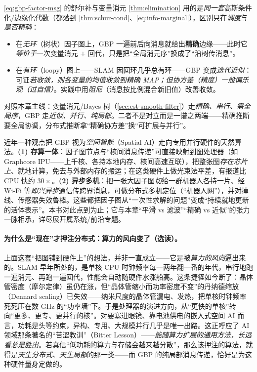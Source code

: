 \begin{insight}
\cref{eq:gbp-factor-msg} 的舒尔补与变量消元 \cref{thm:elimination} 用的是\emph{同一套}高斯条件化/边缘化代数（都落到 \cref{thm:schur-cond}、\cref{eq:info-marginal}），区别只在\emph{调度}与\emph{是否精确}：
\begin{itemize}
  \item 在\emph{无环}（树状）因子图上，GBP 一遍前后向消息就给出\textbf{精确}边缘——此时它\emph{等价于}一次变量消元 $+$ 回代，只是把“全局消元序”换成了“沿树传消息”。
  \item 在\emph{有环}（loopy）图上——SLAM 因回环几乎总有环——GBP 变成\emph{迭代近似}：可证\emph{若收敛，则各变量的均值收敛到精确 MAP；但协方差（精度）一般偏乐观（过自信）}\cite{weiss2001correctness}。实践中用\emph{阻尼}（消息按比例混合新旧值）改善收敛。
\end{itemize}
对照本章主线：变量消元/Bayes 树（\cref{sec:est-smooth-filter}）走\emph{精确、串行、需全局序}，GBP 走\emph{近似、并行、纯局部}。二者不是对立而是一谱之两端——精确推断要全局协调，分布式推断拿“精确协方差”换“可扩展与并行”。
\end{insight}

\begin{insight}
近年一种观点把 GBP 视为\emph{空间智能}（Spatial AI）走向专用并行硬件的天然算法\cite{davison2019futuremapping2}。\textbf{(1) 存算一体}：因子图节点与“核间消息传递”可直接映射到图处理器（如 Graphcore IPU——上千核、各持本地内存、核间高速互联），把整张图\emph{存在芯片上}、就地计算，免去与外部内存的搬运；在这类硬件上做光束法平差，有报道比 CPU 快约 $30\times$\cite{ortiz2020bundleipu}。\textbf{(2) 异步多机}：把一张大因子图\emph{切}给一群机器人各持一片、经 Wi-Fi 等\emph{即兴异步}通信传跨界消息，可做分布式多机定位（“机器人网”），并对掉线、传感器失效鲁棒\cite{murai2024robotweb}。这些都把因子图从“一次性求解的问题”变成“持续就地更新的活体表示”。本书对此点到为止；它与本章“平滑 vs 滤波”“精确 vs 近似”的张力一脉相承，详尽展开属系统/前沿专题。
\end{insight}

\paragraph{为什么是“现在”才押注分布式：算力的风向变了（选读）。}
上面这套“把图铺到硬件上”的想法，并非一直成立——它是被\emph{算力的风向}逼出来的\cite{davison2026computational}。SLAM 早年所处的，是单核 CPU 时钟频率每一两年翻一番的年代，串行地跑一遍消元、再跑一遍回代，性能会自动随硬件水涨船高。这条捷径如今断了：晶体管密度（摩尔定律）虽仍在涨，但“晶体管缩小而功率密度不变”的丹纳德缩放（Dennard scaling）已失效——纳米尺度的晶体管漏电、发热，把单核时钟频率死死压在数 GHz 的“功率墙”下。于是处理器的演进方向，从“更快的单核”转向“更多、更专、更并行的核”。对要塞进眼镜、靠电池供电的嵌入式空间 AI 而言，功耗是头等约束，异构、专用、大规模并行几乎是唯一出路。这正呼应了 AI 领域那条著名的“苦涩教训”（Bitter Lesson）——\emph{能随算力扩展的通用方法，长远看总是胜出}。若真信“低功耗的算力与存储会越来越分散”，那么该押注的算法，就得是\emph{天生分布式、天生局部}的那一类——而 GBP 的纯局部消息传递，恰好是为这种硬件量身定做的。


